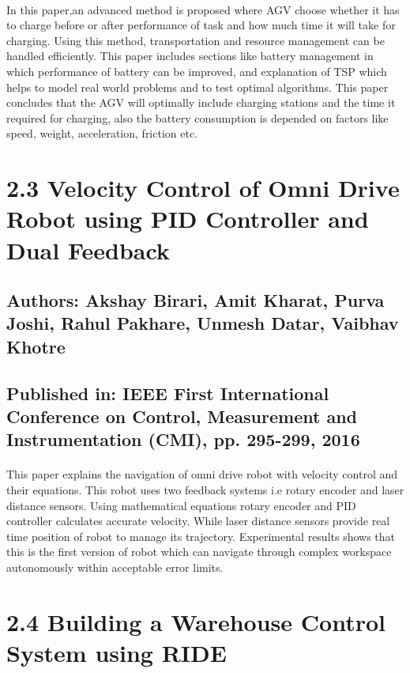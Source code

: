 \paragraph{}In this paper,an advanced method is proposed where AGV choose whether it has to charge before or after performance of task and how much time it will take for charging. Using this method, transportation and resource management can be handled efficiently. This paper includes sections like battery management in which performance of battery can be improved, and explanation of  TSP which helps to model real world problems and to test optimal algorithms. This paper concludes that the AGV will optimally include charging stations and the time it required for charging, also the battery consumption is depended on factors like speed, weight, acceleration, friction etc.

\section*{2.3 Velocity Control of Omni Drive Robot using PID Controller and Dual Feedback\cite{ABirari}}
\subsection*{Authors: Akshay Birari, Amit Kharat, Purva Joshi, Rahul Pakhare, Unmesh Datar, Vaibhav Khotre}
\subsection*{Published in: IEEE First International Conference on Control, Measurement and Instrumentation (CMI), pp. 295-299, 2016}
\paragraph{}This paper explains the navigation of omni drive robot with velocity control and their equations. This robot uses two feedback systems i.e rotary encoder and laser distance sensors. Using mathematical equations rotary encoder and PID controller calculates accurate velocity. While laser distance sensors provide real time position of robot to manage its trajectory. Experimental results shows that this is the first version of robot which can navigate through complex workspace autonomously within acceptable error limits.

\section*{2.4 Building a Warehouse Control System using RIDE\cite{JLopez}}
